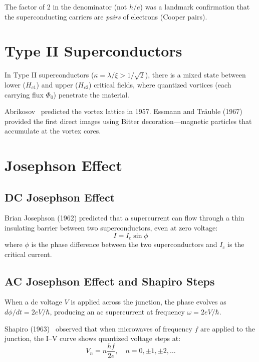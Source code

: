 The factor of 2 in the denominator (not $h/e$) was a landmark confirmation that the superconducting carriers are \textit{pairs} of electrons (Cooper pairs).


\section{Type II Superconductors}

In Type II superconductors ($\kappa = \lambda/\xi > 1/\sqrt{2}$), there is a mixed state between lower ($H_{c1}$) and upper ($H_{c2}$) critical fields, where quantized vortices (each carrying flux $\Phi_0$) penetrate the material.

Abrikosov~\cite{abrikosov2004nobel} predicted the vortex lattice in 1957. Essmann and Tr\"auble (1967) provided the first direct images using Bitter decoration---magnetic particles that accumulate at the vortex cores.


\section{Josephson Effect}

\subsection{DC Josephson Effect}

Brian Josephson (1962) predicted that a supercurrent can flow through a thin insulating barrier between two superconductors, even at zero voltage:
\begin{equation}
  I = I_c \sin\phi
\end{equation}
where $\phi$ is the phase difference between the two superconductors and $I_c$ is the critical current.

\subsection{AC Josephson Effect and Shapiro Steps}

When a dc voltage $V$ is applied across the junction, the phase evolves as $d\phi/dt = 2eV/\hbar$, producing an ac supercurrent at frequency $\omega = 2eV/\hbar$.

Shapiro (1963)~\cite{shapiro1963josephson} observed that when microwaves of frequency $f$ are applied to the junction, the I--V curve shows quantized voltage steps at:
\begin{equation}
  V_n = n\frac{hf}{2e}, \quad n = 0, \pm 1, \pm 2, \ldots
\end{equation}

